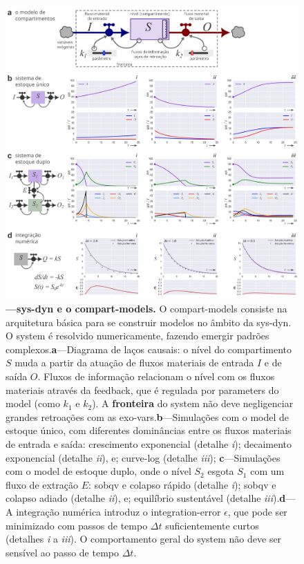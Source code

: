 \documentclass[./main.tex]{subfiles}
\begin{document}
\begin{figure}[t!] %
	\centering				
	\includegraphics[width=0.95\linewidth]{figs/fig_dynamics.jpg}		
	\caption[\gls{sys-dyn} e o \gls{model} de compartimentos]
	{\textbf{---\;\gls{sys-dyn} e o \gls{compart-models}.}\; O \gls{compart-models} consiste na arquitetura básica para se construir modelos no âmbito da \gls{sys-dyn}. O \gls{system} é resolvido numericamente, fazendo emergir padrões complexos.\;\textbf{a}\;---\;Diagrama de laços causais: o nível do compartimento $S$ muda a partir da atuação de fluxos materiais de entrada $I$ e de saída $O$. Fluxos de informação relacionam o nível com os fluxos materiais através da \gls{feedback}, que é regulada por \gls{parameters} do \gls{model} (como $k_1$ e $k_2$). A \textbf{fronteira} do \gls{system} não deve negligenciar grandes retroações com as \gls{exo-vars}.\;\textbf{b}\;---\;Simulações com o \gls{model} de estoque único, com diferentes dominâncias entre os fluxos materiais de entrada e saída: crescimento exponencial (detalhe \textrm{\textit{i}}); decaimento exponencial (detalhe \textrm{\textit{ii}}), e; \gls{curve-log} (detalhe \textrm{\textit{iii}}); \;\textbf{c}\;---\;Simulações com o \gls{model} de estoque duplo, onde o nível $S_2$ esgota $S_1$ com um fluxo de extração $E$: sob\gls{qv} e colapso rápido (detalhe \textrm{\textit{i}}); sob\gls{qv} e colapso adiado (detalhe \textrm{\textit{ii}}), e; equilíbrio sustentável (detalhe \textrm{\textit{iii}}).\;\textbf{d}\;---\;A integração numérica introduz o \gls{integration-error} $\epsilon$, que pode ser minimizado com passos de tempo $\Delta t$ suficientemente curtos (detalhes \textrm{\textit{i}} a \textrm{\textit{iii}}). O comportamento geral do \gls{system} não deve ser sensível ao passo de tempo $\Delta t$.
	}
\label{fig:sys:dynamics}  %
\end{figure}
\end{document}
